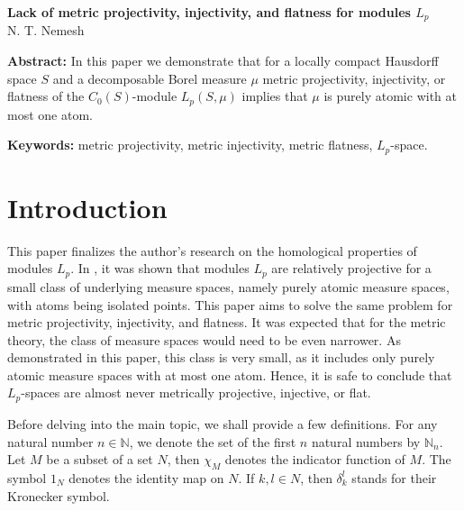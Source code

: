 \documentclass[12pt]{article}
\begin{document}
\begin{center}
    \Large \textbf{Lack of metric projectivity, injectivity, 
    and flatness for modules $L_p$}\\[0.5cm]
    \small {N. T. Nemesh}\\[0.5cm]
\end{center}

\thispagestyle{empty}

\medskip
\textbf{Abstract:} In this paper we demonstrate that for a locally compact 
Hausdorff space $S$ and a decomposable Borel measure $\mu$ metric projectivity, 
injectivity, or flatness of the $C_0(S)$-module $L_p(S,\mu)$ implies 
that $\mu$ is purely atomic with at most one atom.
\medskip

\textbf{Keywords:} metric projectivity, metric injectivity, metric flatness, 
$L_p$-space.

\bigskip


\section{Introduction}\label{SctnIntro}

This paper finalizes the author's research on the homological properties of 
modules $L_p$. In \cite{NemRelProjModLp}, it was shown that modules $L_p$ are 
relatively projective for a small class of underlying measure spaces, namely 
purely atomic measure spaces, with atoms being isolated points. This paper aims 
to solve the same problem for metric projectivity, injectivity, and flatness. 
It was expected that for the metric theory, the class of measure spaces would 
need to be even narrower. As demonstrated in this paper, this class is very 
small, as it includes only purely atomic measure spaces with at most one atom. 
Hence, it is safe to conclude that $L_p$-spaces are almost never metrically 
projective, injective, or flat.

Before delving into the main topic, we shall provide a few definitions. For any 
natural number $n\in\mathbb{N}$, we denote the set of the first $n$ natural 
numbers by $\mathbb{N}_n$. Let $M$ be a subset of a set $N$, then $\chi_M$ 
denotes the indicator function of $M$. The symbol $1_N$ denotes the identity 
map on $N$. If $k,l\in N$, then $\delta_{k}^{l}$ stands for their 
Kronecker symbol.
\end{document}
